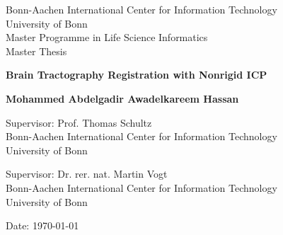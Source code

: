 \documentclass[../structure.tex]{subfiles}
\begin{document}
\begin{titlepage}
\begin{center}
		\vspace*{1cm}
        
        Bonn-Aachen International Center for Information Technology\\
        University of Bonn\\
        Master Programme in Life Science Informatics \\
        Master Thesis \\
        
        \vspace{2cm}
        
        \fontsize{18pt}{20pt}\selectfont
        \textbf{Brain Tractography Registration with Nonrigid ICP}
        
        \vspace{2cm}
        
        \fontsize{14pt}{20pt}\selectfont
        \textbf{Mohammed Abdelgadir Awadelkareem Hassan}
        
        \vspace{1.5cm}
        
        
        \vspace{0.2cm}
        Supervisor: Prof. Thomas Schultz \\Bonn-Aachen International Center for Information Technology \\University of Bonn
        
        \vspace{0.7cm}
        Supervisor: Dr. rer. nat. Martin Vogt \\Bonn-Aachen International Center for Information Technology \\University of Bonn
        
        
        \vspace{2cm}
        
        
        Date: \today
       
        \vspace{0.8cm}
    \end{center}
\end{titlepage}
\end{document}
